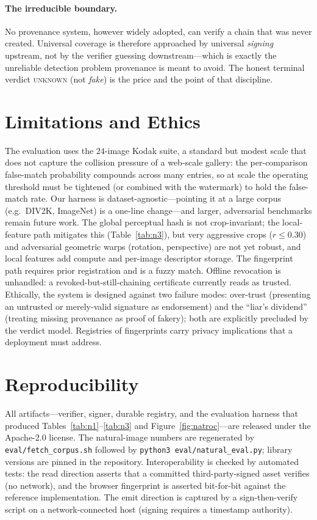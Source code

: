 \documentclass[11pt]{article}
\newcommand{\state}[1]{\textsc{#1}}
\begin{document}
\paragraph{The irreducible boundary.} No provenance system, however widely adopted, can
verify a chain that was never created. Universal coverage is therefore approached by
universal \emph{signing} upstream, not by the verifier guessing downstream---which is exactly
the unreliable detection problem provenance is meant to avoid. The honest terminal verdict
\state{unknown} (not \emph{fake}) is the price and the point of that discipline.

\section{Limitations and Ethics}
The evaluation uses the $24$-image Kodak suite, a standard but modest scale that does not
capture the collision pressure of a web-scale gallery: the per-comparison false-match
probability compounds across many entries, so at scale the operating threshold must be
tightened (or combined with the watermark) to hold the false-match rate. Our harness is
dataset-agnostic---pointing it at a large corpus (e.g.\ DIV2K, ImageNet) is a one-line
change---and larger, adversarial benchmarks remain future work. The global perceptual hash is
not crop-invariant; the local-feature path mitigates this (Table~\ref{tab:n3}), but very
aggressive crops ($r\le 0.30$) and adversarial geometric warps (rotation, perspective) are not
yet robust, and local features add compute and per-image descriptor storage. The fingerprint
path requires prior registration and is a fuzzy match. Offline revocation is unhandled: a
revoked-but-still-chaining certificate currently reads as trusted. Ethically, the system is designed against two failure modes: over-trust
(presenting an untrusted or merely-valid signature as endorsement) and the ``liar's
dividend'' (treating missing provenance as proof of fakery); both are explicitly precluded by
the verdict model. Registries of fingerprints carry privacy implications that a deployment
must address.

\section{Reproducibility}
All artifacts---verifier, signer, durable registry, and the evaluation harness that produced
Tables~\ref{tab:n1}--\ref{tab:n3} and Figure~\ref{fig:natroc}---are released under the
Apache-2.0 license. The natural-image numbers are regenerated by \texttt{eval/fetch\_corpus.sh}
followed by \texttt{python3 eval/natural\_eval.py}; library versions are pinned in the
repository. Interoperability is checked by automated tests: the read direction asserts that a
committed third-party-signed asset verifies (no network), and the browser fingerprint is
asserted bit-for-bit against the reference implementation. The emit direction is captured by a
sign-then-verify script on a network-connected host (signing requires a timestamp authority).
\end{document}
